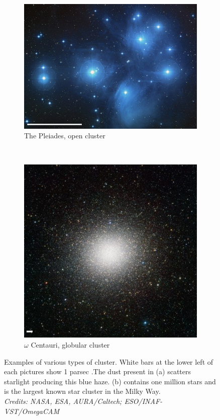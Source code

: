 \begin{figure}
    \centering
    \begin{subfigure}[b]{0.55\textwidth}
        \includegraphics[width=\textwidth]{Figures/0_Pleiades_scale.jpg}
        \caption{The Pleiades, open cluster}
        \label{Fig:0_openglobular1.open}
    \end{subfigure}
    ~ 
    \begin{subfigure}[b]{0.4\textwidth}
        \includegraphics[width=\textwidth]{Figures/0_omega_centauri_scale.jpg}
        \caption{$\omega$ Centauri, globular cluster}
        \label{Fig:0_openglobular1.glob}
    \end{subfigure}
     \caption{Examples of various types of cluster. White bars at the lower left of each pictures show 1 parsec .The dust present in (a) scatters starlight producing this blue haze. (b) contains one million stars and is the largest known star cluster in the Milky Way.\\\textit{Credits: NASA, ESA, AURA/Caltech; ESO/INAF-VST/OmegaCAM}}
     \label{Fig:0_openglobular}
\end{figure}



